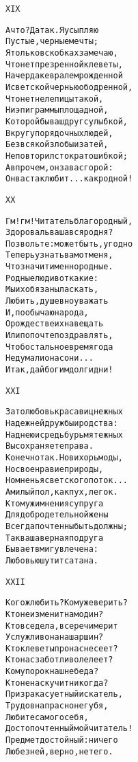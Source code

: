 \begin{minipage}[t]{\dimexpr 0.5\textwidth -\tabcolsep-.5pt}
\begin{alltt}\normalfont\centering
XIX

А что? Да так. Я усыпляю
Пустые, черные мечты;
Я только в скобках замечаю,
Что нет презренной клеветы,
На чердаке вралем рожденной
И светской чернью ободренной,
Что нет нелепицы такой,
Ни эпиграммы площадной,
Которой бы ваш друг с улыбкой,
В кругу порядочных людей,
Без всякой злобы и затей,
Не повторил стократ ошибкой;
А впрочем, он за вас горой:
Он вас так любит... как родной!
\end{alltt}
\end{minipage}

\begin{minipage}[t]{\dimexpr 0.5\textwidth -\tabcolsep-.5pt}
\begin{alltt}\normalfont\centering
XX

Гм! гм! Читатель благородный,
Здорова ль ваша вся родня?
Позвольте: может быть, угодно
Теперь узнать вам от меня,
Что значит именно родные.
Родные люди вот какие:
Мы их обязаны ласкать,
Любить, душевно уважать
И, по обычаю народа,
О рождестве их навещать
Или по почте поздравлять,
Чтоб остальное время года
Не думали о нас они...
Итак, дай бог им долги дни!
\end{alltt}
\end{minipage}
\clearpage

\begin{minipage}[t]{\dimexpr 0.5\textwidth -\tabcolsep-.5pt}
\begin{alltt}\normalfont\centering
XXI

Зато любовь красавиц нежных
Надежней дружбы и родства:
Над нею и средь бурь мятежных
Вы сохраняете права.
Конечно так. Но вихорь моды,
Но своенравие природы,
Но мненья светского поток...
А милый пол, как пух, легок.
К тому ж и мнения супруга
Для добродетельной жены
Всегда почтенны быть должны;
Так ваша верная подруга
Бывает вмиг увлечена:
Любовью шутит сатана.
\end{alltt}
\end{minipage}

\begin{minipage}[t]{\dimexpr 0.5\textwidth -\tabcolsep-.5pt}
\begin{alltt}\normalfont\centering
XXII

Кого ж любить? Кому же верить?
Кто не изменит нам один?
Кто все дела, все речи мерит
Услужливо на наш аршин?
Кто клеветы про нас не сеет?
Кто нас заботливо лелеет?
Кому порок наш не беда?
Кто не наскучит никогда?
Призрака суетный искатель,
Трудов напрасно не губя,
Любите самого себя,
Достопочтенный мой читатель!
Предмет достойный: ничего
Любезней, верно, нет его.
\end{alltt}
\end{minipage}
\clearpage

